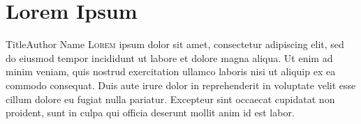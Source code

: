 \documentclass[../main.tex]{subfiles}
\begin{document}
	\chapter{Lorem Ipsum}
	\begin{article*}{Title}{Author Name}
		\lettrine[lines=3, findent=3pt, nindent=0pt]{L}{orem}
		ipsum dolor sit amet, consectetur adipiscing elit, sed do eiusmod
		tempor incididunt ut labore et dolore magna aliqua. Ut enim ad minim
		veniam, quis nostrud exercitation ullamco laboris nisi ut aliquip ex ea
		commodo consequat. Duis aute irure dolor in reprehenderit in voluptate
		velit esse cillum dolore eu fugiat nulla pariatur. Excepteur sint occaecat
		cupidatat non proident, sunt in culpa qui officia deserunt mollit anim id
		est labor.



		\lipsum[2-10]	
	\end{article*}
\end{document}
